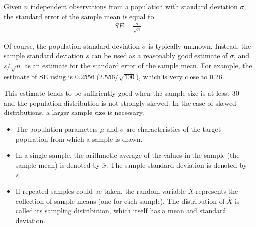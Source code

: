 \begin{spacing}{1.5}


\begin{termBox}{
Given $n$ independent observations from a population with standard deviation $\sigma$, the standard error of the sample mean is equal to \vspace{-1mm}
\begin{align*}
SE = \frac{\sigma}{\sqrt{n}}
\label{seOfXBar}
\end{align*}\vspace{-3mm}%
}
\end{termBox}

Of course, the population standard deviation $\sigma$ is typically unknown. Instead, the sample standard deviation $s$ can be used as a reasonably good estimate of $\sigma$, and $s / \sqrt{n}$ as an estimate for the standard error of the sample mean. For example, the estimate of SE using  is 0.2556 ($2.556 / \sqrt{100}$), which is very close to 0.26.

This estimate tends to be sufficiently good when the sample size is at least 30 and the population distribution is not strongly skewed. In the case of skewed distributions, a larger sample size is necessary.



\begin{itemize}
\setlength{\itemsep}{0mm}	
	\item The population parameters $\mu$ and $\sigma$ are characteristics of the target population from which a sample is drawn. 
	
	\item In a single sample, the arithmetic average of the values in the sample (the sample mean) is denoted by $\overline{x}$. The sample standard deviation is denoted by $s$. 
	
	\item If repeated samples could be taken, the random variable $\overline{X}$ represents the collection of sample means (one for each sample). The distribution of $\overline{X}$ is called its sampling distribution, which itself has a mean and standard deviation. 
	

\end{itemize}
\end{spacing}
